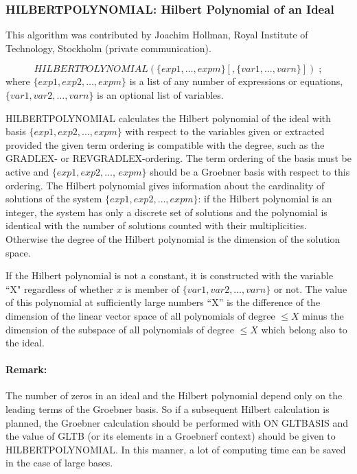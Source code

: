 \subsubsection{HILBERTPOLYNOMIAL: Hilbert Polynomial of an
Ideal}
This algorithm was contributed by {\sc Joachim Hollman}, Royal
Institute of Technology, Stockholm (private communication).

\[
HILBERTPOLYNOMIAL (\{exp1, \ldots , expm\}
[,\{var1, \ldots , varn\}])\;;
\]
where $\{exp1, exp2, \ldots , expm\}$ is a list of any number of
expressions or equations, $\{var1, var2, \ldots , varn\}$ is an
optional list of variables.

HILBERTPOLYNOMIAL calculates the Hilbert polynomial of the ideal
with basis $\{exp1, exp2, \ldots , expm\}$ with respect to the
variables given or extracted provided the given term ordering is
compatible with the degree, such as the GRADLEX- or REVGRADLEX-ordering.
The term ordering of the basis
must be active and $\{exp1, exp2,\ldots$, $ expm\}$ should be a
Groebner basis with respect to this ordering. The Hilbert polynomial
gives information about the cardinality of solutions of the system
$\{exp1, exp2, \ldots , expm\}$: if the Hilbert polynomial is an
integer, the system has only a discrete set of solutions and the
polynomial is identical with the number of solutions counted with
their multiplicities. Otherwise the degree of the Hilbert
polynomial is the dimension of the solution space.

If the Hilbert polynomial is not a constant, it is constructed with the
variable ``X" regardless of whether $x$ is member of $\{var1, var2, \ldots ,
varn\}$ or not. The value of this polynomial at sufficiently
large numbers  ``X''
is the difference
of the dimension of the linear vector space of all polynomials of degree
$ \leq X $ minus the dimension of the subspace of all polynomials of
degree $\leq X $ which belong also to the ideal.

\paragraph{Remark:} The number of zeros in an ideal and the
Hilbert polynomial depend only on the leading terms of the
Groebner basis. So if a subsequent Hilbert calculation is planned, the
Groebner calculation should be performed with ON GLTBASIS and
the value of GLTB (or its elements in a Groebnerf context) should be
given to HILBERTPOLYNOMIAL.  In this manner, a lot of computing time can be
saved in the case of large bases.

